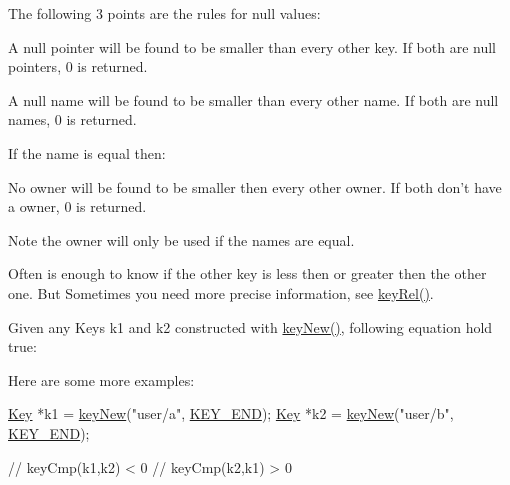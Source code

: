 The following 3 points are the rules for null values\+:


\begin{DoxyItemize}
\item A null pointer will be found to be smaller than every other key. If both are null pointers, 0 is returned.
\item A null name will be found to be smaller than every other name. If both are null names, 0 is returned.
\end{DoxyItemize}

If the name is equal then\+:


\begin{DoxyItemize}
\item No owner will be found to be smaller then every other owner. If both don't have a owner, 0 is returned.
\end{DoxyItemize}

\begin{DoxyNote}{Note}
the owner will only be used if the names are equal.
\end{DoxyNote}
Often is enough to know if the other key is less then or greater then the other one. But Sometimes you need more precise information, see \hyperlink{group__keytest_ga6bb0f95ac34ce9c42d61bb35a76139d0}{key\+Rel()}.

Given any Keys k1 and k2 constructed with \hyperlink{group__key_gad23c65b44bf48d773759e1f9a4d43b89}{key\+New()}, following equation hold true\+:


\begin{DoxyCodeInclude}
\end{DoxyCodeInclude}
 Here are some more examples\+: 
\begin{DoxyCode}
\hyperlink{classkdb_1_1Key_a5679f5cae63caddd64a60388b9cc77fa}{Key} *k1 = \hyperlink{group__key_gad23c65b44bf48d773759e1f9a4d43b89}{keyNew}(\textcolor{stringliteral}{"user/a"}, \hyperlink{group__key_gga91fb3178848bd682000958089abbaf40aa8adb6fcb92dec58fb19410eacfdd403}{KEY\_END});
\hyperlink{classkdb_1_1Key_a5679f5cae63caddd64a60388b9cc77fa}{Key} *k2 = \hyperlink{group__key_gad23c65b44bf48d773759e1f9a4d43b89}{keyNew}(\textcolor{stringliteral}{"user/b"}, \hyperlink{group__key_gga91fb3178848bd682000958089abbaf40aa8adb6fcb92dec58fb19410eacfdd403}{KEY\_END});

\textcolor{comment}{// keyCmp(k1,k2) < 0}
\textcolor{comment}{// keyCmp(k2,k1) > 0}
\end{DoxyCode}


